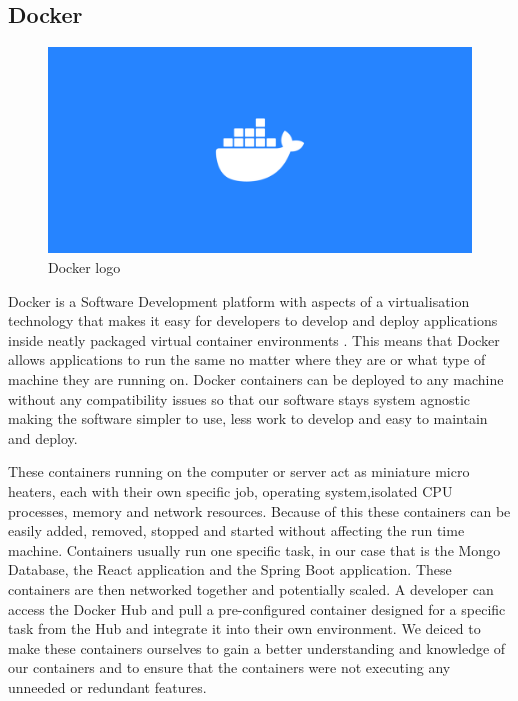 \subsection{Docker}
\begin{figure}[th]
\renewcommand\thefigure{3.4}
\centering
\includegraphics[scale=0.2]{img/docker-logo.png}
\caption{Docker logo}
\label{Docker}
\end{figure}

Docker is a Software Development platform with aspects of a virtualisation technology that makes it easy for developers to develop and deploy applications inside neatly packaged virtual container environments \cite{Docker}. This means that Docker allows applications to run the same no matter where they are or what type of machine they are running on. Docker containers can be deployed to any machine without any compatibility issues so that our software stays system agnostic making the software simpler to use, less work to develop and easy to maintain and deploy. \par
These containers running on the computer or server act as miniature micro heaters, each with their own specific job, operating system,isolated CPU processes, memory and network resources. Because of this these containers can be easily added, removed, stopped and started without affecting the run time machine. Containers usually run one specific task, in our case that is the Mongo Database, the React application and the Spring Boot application. These containers are then networked together and potentially scaled. A developer can access the Docker Hub and pull a pre-configured container designed for a specific task from the Hub and integrate it into their own environment. We deiced to make these containers ourselves to gain a better understanding and knowledge of our containers and to ensure that the containers were not executing any unneeded or redundant features.


